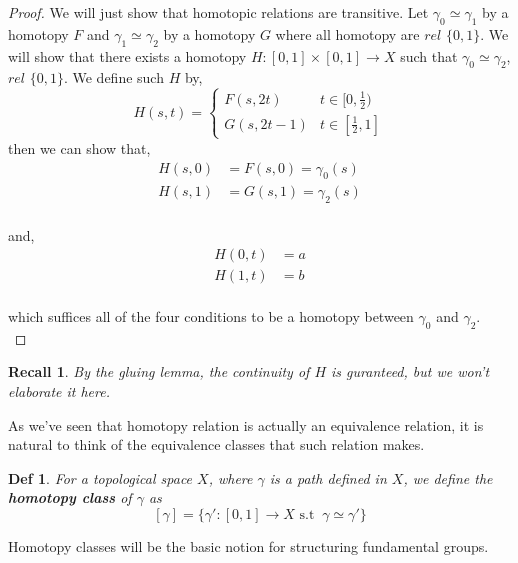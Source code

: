 \documentclass[paper=a4, fontsize=11pt]{scrartcl}
\newtheorem{definition}{Def}
\newtheorem*{recall}{Recall}
\begin{document}
\begin{proof}
	We will just show that homotopic relations are transitive. Let $\gamma_0 \simeq \gamma_1$ by a homotopy $F$ and $\gamma_1 \simeq \gamma_2$ by a homotopy $G$ where all homotopy are $rel$ $\{0,1\}$. We will show that there exists a homotopy $H:[0,1]\times[0,1]\to X$ such that $\gamma_0 \simeq \gamma_2$, $rel$ $\{0,1\}$. We define such $H$ by,\\
	\begin{equation}\nonumber
		H(s,t) = 
		\begin{cases}
		F(s,2t) & t\in[0,\frac{1}{2})\\
		G(s,2t-1) & t\in[\frac{1}{2},1]
		\end{cases}
	\end{equation} 
	then we can show that,\\
	\begin{equation}\nonumber
		\begin{split}
		H(s,0) &= F(s,0) = \gamma_0(s)\\
		H(s,1) &= G(s,1) = \gamma_2(s)
		\end{split}
	\end{equation}\\
	and,
	\begin{equation}\nonumber
	\begin{split}
	H(0,t) &= a\\
	H(1,t) &= b
	\end{split}
	\end{equation}\\
	which suffices all of the four conditions to be a homotopy between $\gamma_0$ and $\gamma_2$.\\
\end{proof}

\begin{recall}
	By the gluing lemma, the continuity of $H$ is guranteed, but we won't elaborate it here.\\
\end{recall}

As we've seen that homotopy relation is actually an equivalence relation, it is natural to think of the equivalence classes that such relation makes.\\

\begin{definition}
	For a topological space $X$, where $\gamma$ is a path defined in $X$, we define the \textbf{homotopy class} of $\gamma$ as\\
	\begin{equation} \nonumber
		[\gamma] = \{\gamma ' : [0,1]\to X \text{ s.t }\ \gamma \simeq \gamma' \} 
	\end{equation}
\end{definition}
\vspace{0.15in}
Homotopy classes will be the basic notion for structuring fundamental groups.\\
\end{document}
